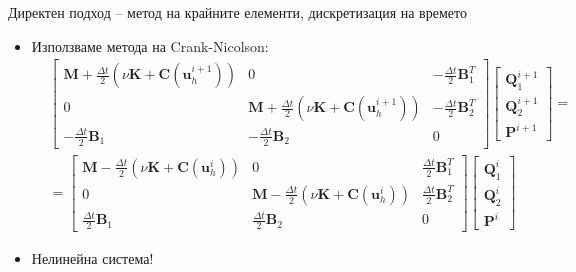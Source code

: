 \documentclass{beamer}
\begin{document}
    \begin{frame}{Директен подход -- метод на крайните елементи, дискретизация на времето}
    \begin{itemize}[<+->]
    		\item Използваме метода на Crank-Nicolson:
		\small
		\begin{align*}
	&\begin{bmatrix}
		\mathbf{M}+\frac{\Delta t}{2}\left(\nu\mathbf{K}+\mathbf{C}(\mathbf{u}_h^{i+1})\right) & 0 & -\frac{\Delta t}{2}\mathbf{B}^T_1 \\
		0 &\mathbf{M}+\frac{\Delta t}{2}\left(\nu\mathbf{K}+\mathbf{C}(\mathbf{u}_h^{i+1})\right) & -\frac{\Delta t}{2}\mathbf{B}^T_2 \\
		-\frac{\Delta t}{2}\mathbf{B}_1 & -\frac{\Delta t}{2}\mathbf{B}_2 & 0
	\end{bmatrix}
	\begin{bmatrix}
		\mathbf{Q}_1^{i+1}\\
		\mathbf{Q}_2^{i+1}\\
		\mathbf{P}^{i+1}
	\end{bmatrix} = \\
	&=\begin{bmatrix}
		\mathbf{M}-\frac{\Delta t}{2}\left(\nu\mathbf{K}+\mathbf{C}(\mathbf{u}_h^{i})\right) & 0 & \frac{\Delta t}{2}\mathbf{B}^T_1 \\
		0 &\mathbf{M}-\frac{\Delta t}{2}\left(\nu\mathbf{K}+\mathbf{C}(\mathbf{u}_h^{i})\right) & \frac{\Delta t}{2}\mathbf{B}^T_2 \\
		\frac{\Delta t}{2}\mathbf{B}_1 & \frac{\Delta t}{2}\mathbf{B}_2 & 0
	\end{bmatrix}
	\begin{bmatrix}
		\mathbf{Q}_1^{i}\\
		\mathbf{Q}_2^{i}\\
		\mathbf{P}^{i}
	\end{bmatrix}
\end{align*}
	\item Нелинейна система!
    \end{itemize}
		
    \end{frame}
\end{document}
